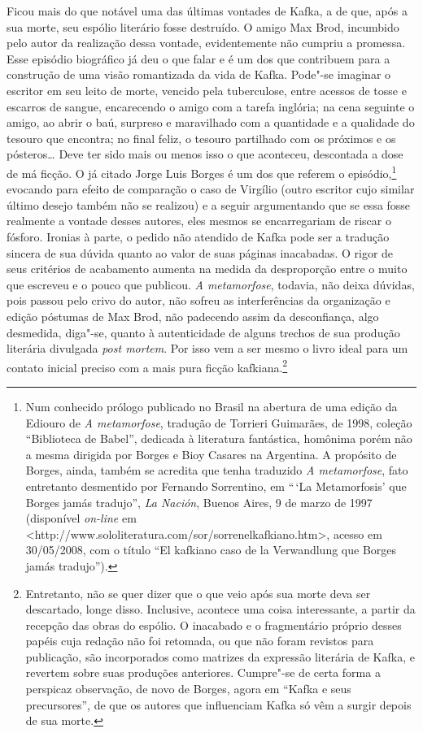 Ficou mais do que notável uma das últimas vontades de Kafka, a de que,
após a sua morte, seu espólio literário fosse destruído. O amigo Max
Brod, incumbido pelo autor da realização dessa vontade, evidentemente
não cumpriu a promessa. Esse episódio biográfico já deu o que falar e é
um dos que contribuem para a construção de uma visão romantizada da vida de
Kafka. Pode"-se imaginar o escritor em seu leito de morte, vencido
pela tuberculose, entre acessos de tosse e escarros de sangue,
encarecendo o amigo com a tarefa inglória; na cena seguinte o amigo, ao
abrir o baú, surpreso e maravilhado com a quantidade e a qualidade do
tesouro que encontra; no final feliz, o tesouro partilhado com os
próximos e os pósteros\ldots{} Deve ter sido mais ou menos isso o que
aconteceu, descontada a dose de má ficção. O já citado Jorge Luis
Borges é um dos que referem o episódio,\footnote{ Num conhecido prólogo
publicado no Brasil na abertura de uma edição da Ediouro de \textit{A
metamorfose}, tradução de Torrieri Guimarães, de 1998, coleção
“Biblioteca de Babel”, dedicada à literatura fantástica, homônima porém
não a mesma dirigida por Borges e Bioy Casares na Argentina. A
propósito de Borges, ainda, também se acredita que tenha traduzido
\textit{A metamorfose}, fato entretanto desmentido por Fernando
Sorrentino, em ``\,`La Metamorfosis’ que Borges jamás tradujo”, \textit{La
Nación}, Buenos Aires, 9 de marzo de 1997 (disponível \textit{on-line} em
<http://www.sololiteratura.com/sor/sorrenelkafkiano.htm>, acesso em
30/05/2008, com o título “El kafkiano caso de la Verwandlung que Borges
jamás tradujo”).} evocando para efeito de comparação o caso de Virgílio
(outro escritor cujo similar último desejo também não se realizou) e a
seguir argumentando que se essa fosse realmente a vontade desses
autores, eles mesmos se encarregariam de riscar o fósforo. Ironias à
parte, o pedido não atendido de Kafka pode ser a tradução sincera de
sua dúvida quanto ao valor de suas páginas inacabadas. O rigor de seus
critérios de acabamento aumenta na medida da desproporção entre o muito
que escreveu e o pouco que publicou. \textit{A metamorfose}, todavia,
não deixa dúvidas, pois passou pelo crivo do autor, não sofreu as
interferências da organização e edição póstumas de Max Brod, não
padecendo assim da desconfiança, algo desmedida, diga"-se, quanto à
autenticidade de alguns trechos de sua produção literária divulgada
\textit{post mortem}. Por isso vem a ser mesmo o livro ideal para um
contato inicial preciso com a mais pura ficção kafkiana.\footnote{
Entretanto, não se quer dizer que o que veio após sua morte deva ser
descartado, longe disso. Inclusive, acontece uma coisa interessante, a
partir da recepção das obras do espólio. O inacabado e o fragmentário
próprio desses papéis cuja redação não foi retomada, ou que não foram
revistos para publicação, são incorporados como matrizes da expressão
literária de Kafka, e revertem sobre suas produções anteriores.
Cumpre"-se de certa forma a perspicaz observação, de novo de Borges,
agora em “Kafka e seus precursores”, de que os autores que influenciam
Kafka só vêm a surgir depois de sua morte.}

